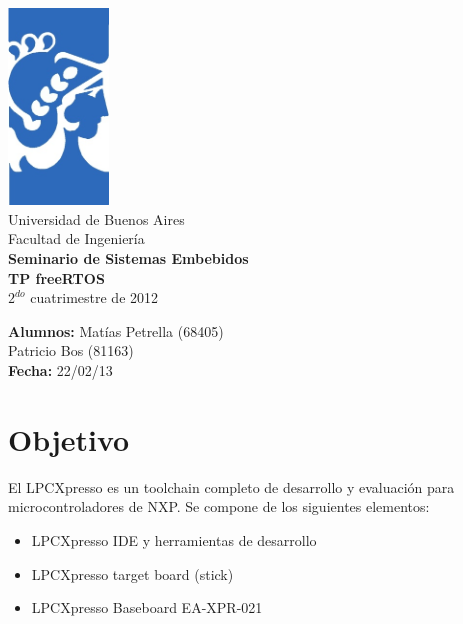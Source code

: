 \documentclass[a4paper,12pt]{article}
\begin{document}
\thispagestyle{empty}

\begin{center}
	\includegraphics[width=0.2\textwidth,angle=0]{./imagenes/logo-facu.png}\\
	\huge{{Universidad de Buenos Aires}}\\
	\huge{{Facultad de Ingeniería}}\\
	\vspace{2.2cm}
	\Huge{\textbf{Seminario de Sistemas Embebidos}}\\
	\vspace{0.5cm}
	\Large{\textbf{TP freeRTOS}}\\
	\vspace{1.5cm}
	\Large{$2^{do}$ cuatrimestre de 2012}\\
	\vspace{2cm}	
\end{center}

\begin{flushright}
		\textbf{Alumnos:}  Matías Petrella (68405)\\
		 Patricio Bos (81163)\\
		\textbf{Fecha:}  22/02/13\\
\end{flushright}



\tableofcontents
\newpage

\section{Objetivo}

El LPCXpresso es un toolchain completo de desarrollo y evaluación para microcontroladores de NXP.
Se compone de los siguientes elementos:
\begin{itemize}
\item LPCXpresso IDE y herramientas de desarrollo
\item LPCXpresso target board (stick)
\item LPCXpresso Baseboard EA-XPR-021
\end{itemize}
\end{document}
